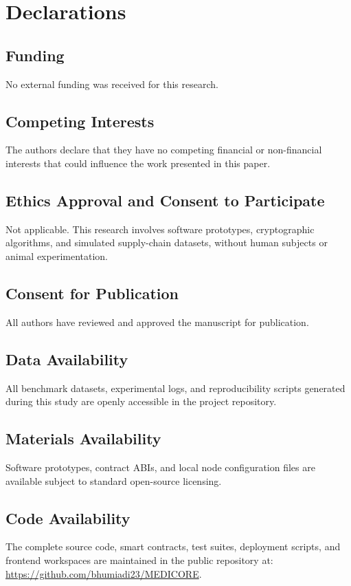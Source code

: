 \documentclass[pdflatex,sn-mathphys-num]{sn-jnl}
\theoremstyle{thmstyleone}
\theoremstyle{thmstyletwo}
\theoremstyle{thmstylethree}
\begin{document}

\section*{Declarations}

\subsection*{Funding}
No external funding was received for this research.

\subsection*{Competing Interests}
The authors declare that they have no competing financial or non-financial interests that could influence the work presented in this paper.

\subsection*{Ethics Approval and Consent to Participate}
Not applicable. This research involves software prototypes, cryptographic algorithms, and simulated supply-chain datasets, without human subjects or animal experimentation.

\subsection*{Consent for Publication}
All authors have reviewed and approved the manuscript for publication.

\subsection*{Data Availability}
All benchmark datasets, experimental logs, and reproducibility scripts generated during this study are openly accessible in the project repository.

\subsection*{Materials Availability}
Software prototypes, contract ABIs, and local node configuration files are available subject to standard open-source licensing.

\subsection*{Code Availability}
The complete source code, smart contracts, test suites, deployment scripts, and frontend workspaces are maintained in the public repository at: \url{https://github.com/bhumiadi23/MEDICORE}.
\end{document}
